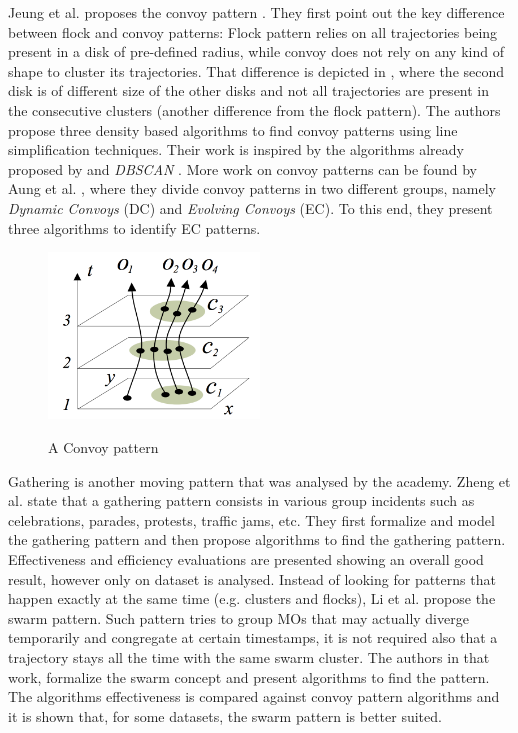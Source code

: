 Jeung et al. proposes the convoy pattern \citep{convoy2}\citep{convoy}. They first point out the key difference between
flock and convoy patterns: Flock pattern relies on all trajectories being present in a disk of pre-defined radius, while
convoy does not rely on any kind of shape to cluster its trajectories. That difference is depicted in
, where the second disk is of different size of the other disks and not all trajectories are
present in the consecutive clusters (another difference from the flock pattern). The authors propose three density based
algorithms to find convoy patterns using line simplification techniques. Their work is inspired by the algorithms
already proposed by \citep{movingclusters} and \textit{DBSCAN} \citep{dbscan}. More work on convoy patterns can be found
by Aung et al. \citep{convoy3}, where they divide convoy patterns in two different groups, namely \textit{Dynamic
Convoys} (DC) and \textit{Evolving Convoys} (EC). To this end, they present three algorithms to identify EC patterns.

\begin{figure}
    \centering
    \caption{A Convoy pattern \citep{convoy2}}
    \includegraphics[width=0.5\textwidth]{images/convoy.png}
    \label{fig:convoy_pattern}
\end{figure}

Gathering is another moving pattern that was analysed by the academy. Zheng et al. \citep{gathering} state that a
gathering pattern consists in various group incidents such as celebrations, parades, protests, traffic jams, etc. They
first formalize and model the gathering pattern and then propose algorithms to find the gathering pattern. Effectiveness
and efficiency evaluations are presented showing an overall good result, however only on dataset is analysed. Instead of
looking for patterns that happen exactly at the same time (e.g. clusters and flocks), Li et al. \citep{swarm} propose
the swarm pattern. Such pattern tries to group MOs that may actually diverge temporarily and congregate at certain
timestamps, it is not required also that a trajectory stays all the time with the same swarm cluster. The authors in
that work, formalize the swarm concept and present algorithms to find the pattern. The algorithms effectiveness is
compared against convoy pattern algorithms and it is shown that, for some datasets, the swarm pattern is better suited.

